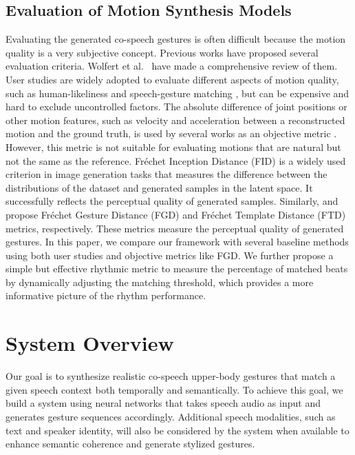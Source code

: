 \documentclass[acmtog,authorversion]{acmart}
\begin{document}
\subsection{Evaluation of Motion Synthesis Models}
Evaluating the generated co-speech gestures is often difficult because the motion quality is a very subjective concept. Previous works have proposed several evaluation criteria. Wolfert et al.~ have made a comprehensive review of them. User studies are widely adopted to evaluate different aspects of motion quality, such as human-likeliness and speech-gesture matching \cite{alexanderson2020style, yoon2020speech, kucherenko2020gesticulator}, but can be expensive and hard to exclude uncontrolled factors. The absolute difference of joint positions or other motion features, such as velocity and acceleration between a reconstructed motion and the ground truth, is used by several works as an objective metric \cite{ginosar2019learning, joo2019towards, kucherenko2019analyzing}. However, this metric is not suitable for evaluating motions that are natural but not the same as the reference. Fr{\'e}chet Inception Distance (FID) \cite{heusel2017gans} is a widely used criterion in image generation tasks that measures the difference between the distributions of the dataset and generated samples in the latent space. It successfully reflects the perceptual quality of generated samples. Similarly, \citet{yoon2020speech} and \citet{qian2021speech} propose Fr{\'e}chet Gesture Distance (FGD) and Fr{\'e}chet Template Distance (FTD) metrics, respectively. These metrics measure the perceptual quality of generated gestures. In this paper, we compare our framework with several baseline methods using both user studies and objective metrics like FGD. We further propose a simple but effective rhythmic metric to measure the percentage of matched beats by dynamically adjusting the matching threshold, which provides a more informative picture of the rhythm performance. \section{System Overview}
\label{sec:system_overview}
Our goal is to synthesize realistic co-speech upper-body gestures that match a given speech context both temporally and semantically. To achieve this goal, we build a system using neural networks that takes speech audio as input and generates gesture sequences accordingly. Additional speech modalities, such as text and speaker identity, will also be considered by the system when available to enhance semantic coherence and generate stylized gestures.
\end{document}
